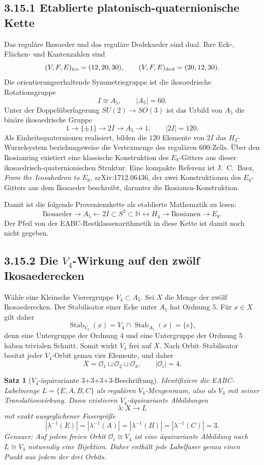 \documentclass[11pt,a4paper]{article}
\newtheorem{satz}{Satz}
\begin{document}
\subsection*{3.15.1 Etablierte platonisch-quaternionische Kette}
Das reguläre Ikosaeder und das reguläre Dodekaeder sind dual. Ihre Eck-, Flächen- und Kantenzahlen sind
\[
(V,F,E)_{\rm ico}=(12,20,30),\qquad
(V,F,E)_{\rm dod}=(20,12,30).
\]
Die orientierungserhaltende Symmetriegruppe ist die ikosaedrische Rotationsgruppe
\[
I\cong A_5,\qquad |A_5|=60.
\]
Unter der Doppelüberlagerung $SU(2)\to SO(3)$ ist das Urbild von $A_5$ die binäre ikosaedrische Gruppe
\[
1\longrightarrow\{\pm1\}\longrightarrow 2I\longrightarrow A_5\longrightarrow1,
\qquad |2I|=120.
\]
Als Einheitsquaternionen realisiert, bilden die $120$ Elemente von $2I$ das $H_4$-Wurzelsystem beziehungsweise die Vertexmenge des regulären 600-Zells. Über den Ikosianring existiert eine klassische Konstruktion des $E_8$-Gitters aus dieser ikosaedrisch-quaternionischen Struktur. Eine kompakte Referenz ist J.~C.~Baez, \emph{From the Icosahedron to $E_8$}, arXiv:1712.06436, der zwei Konstruktionen des $E_8$-Gitters aus dem Ikosaeder beschreibt, darunter die Ikosianen-Konstruktion.

Damit ist die folgende Provenienzkette als etablierte Mathematik zu lesen:
\[
\boxed{
\text{Ikosaeder}
\longrightarrow A_5
\longleftarrow 2I\subset S^3\subset\mathbb H
\longleftrightarrow H_4
\longrightarrow \text{Ikosianen}
\longrightarrow E_8.}
\]
Der Pfeil von der EABC-Restklassenarithmetik in diese Kette ist damit noch nicht gegeben.

\subsection*{3.15.2 Die $V_4$-Wirkung auf den zwölf Ikosaederecken}
Wähle eine Kleinsche Vierergruppe $V_4\subset A_5$. Sei $X$ die Menge der zwölf Ikosaederecken. Der Stabilisator einer Ecke unter $A_5$ hat Ordnung $5$. Für $x\in X$ gilt daher
\[
\operatorname{Stab}_{V_4}(x)
=
V_4\cap \operatorname{Stab}_{A_5}(x)
=
\{e\},
\]
denn eine Untergruppe der Ordnung $4$ und eine Untergruppe der Ordnung $5$ haben trivialen Schnitt. Somit wirkt $V_4$ frei auf $X$. Nach Orbit--Stabilisator besitzt jeder $V_4$-Orbit genau vier Elemente, und daher
\[
\boxed{X=\mathcal O_1\sqcup\mathcal O_2\sqcup\mathcal O_3,
\qquad |\mathcal O_i|=4.}
\]

\begin{satz}[$V_4$-äquivariante 3+3+3+3-Beschriftung]
Identifiziere die EABC-Labelmenge $L=\{E,A,B,C\}$ als regulären $V_4$-Mengenraum, also als $V_4$ mit seiner Translationwirkung. Dann existieren $V_4$-äquivariante Abbildungen
\[
\lambda:X\longrightarrow L
\]
mit exakt ausgeglichener Fasergröße
\[
|\lambda^{-1}(E)|=|\lambda^{-1}(A)|=|\lambda^{-1}(B)|=|\lambda^{-1}(C)|=3.
\]
Genauer: Auf jedem freien Orbit $\mathcal O_i\cong V_4$ ist eine äquivariante Abbildung nach $L\cong V_4$ notwendig eine Bijektion. Daher enthält jede Labelfaser genau einen Punkt aus jedem der drei Orbits.
\end{satz}
\end{document}
